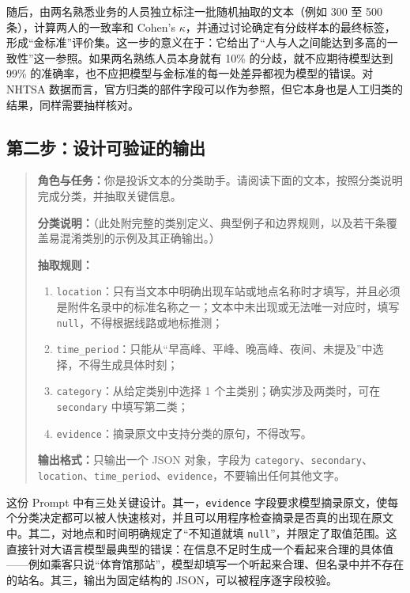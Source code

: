 随后，由两名熟悉业务的人员独立标注一批随机抽取的文本（例如 300 至 500 条），计算两人的一致率和 Cohen's $\kappa$，并通过讨论确定有分歧样本的最终标签，形成“金标准”评价集。这一步的意义在于：它给出了“人与人之间能达到多高的一致性”这一参照。如果两名熟练人员本身就有 10\% 的分歧，就不应期待模型达到 99\% 的准确率，也不应把模型与金标准的每一处差异都视为模型的错误。对 NHTSA 数据而言，官方归类的部件字段可以作为参照，但它本身也是人工归类的结果，同样需要抽样核对。

\subsection{第二步：设计可验证的输出}

\begin{quote}
\textbf{角色与任务：}你是投诉文本的分类助手。请阅读下面的文本，按照分类说明完成分类，并抽取关键信息。

\textbf{分类说明：}（此处附完整的类别定义、典型例子和边界规则，以及若干条覆盖易混淆类别的示例及其正确输出。）

\textbf{抽取规则：}
\begin{enumerate}
  \item \texttt{location}：只有当文本中明确出现车站或地点名称时才填写，并且必须是附件名录中的标准名称之一；文本中未出现或无法唯一对应时，填写 \texttt{null}，不得根据线路或地标推测；
  \item \texttt{time\_period}：只能从“早高峰、平峰、晚高峰、夜间、未提及”中选择，不得生成具体时刻；
  \item \texttt{category}：从给定类别中选择 1 个主类别；确实涉及两类时，可在 \texttt{secondary} 中填写第二类；
  \item \texttt{evidence}：摘录原文中支持分类的原句，不得改写。
\end{enumerate}

\textbf{输出格式：}只输出一个 JSON 对象，字段为 \texttt{category}、\texttt{secondary}、\texttt{location}、\texttt{time\_period}、\texttt{evidence}，不要输出任何其他文字。
\end{quote}

这份 Prompt 中有三处关键设计。其一，\texttt{evidence} 字段要求模型摘录原文，使每个分类决定都可以被人快速核对，并且可以用程序检查摘录是否真的出现在原文中。其二，对地点和时间明确规定了“不知道就填 \texttt{null}”，并限定了取值范围。这直接针对大语言模型最典型的错误：在信息不足时生成一个看起来合理的具体值——例如乘客只说“体育馆那站”，模型却填写一个听起来合理、但名录中并不存在的站名。其三，输出为固定结构的 JSON，可以被程序逐字段校验。

